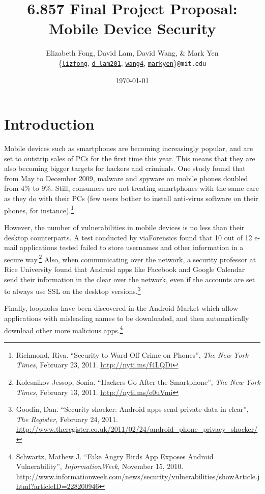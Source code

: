 \documentclass[11pt]{article}
\begin{document}
\title{6.857 Final Project Proposal: Mobile Device Security}
\author{Elizabeth Fong, David Lam, David Wang, \& Mark Yen\\
\{\href{mailto:lizfong@mit.edu}{\texttt{lizfong}}, \href{mailto:d_lam201@mit.edu}{\texttt{d\_lam201}}, \href{mailto:wang4@mit.edu}{\texttt{wang4}}, \href{mailto:markyen@mit.edu}{\texttt{markyen}}\}\texttt{@mit.edu}}
\date{\today}
\maketitle

\section{Introduction}
Mobile devices such as smartphones are becoming increasingly popular, and are set to outstrip sales of PCs for the first time this year. This means that they are also becoming bigger targets for hackers and criminals. One study found that from May to December 2009, malware and spyware on mobile phones doubled from 4\% to 9\%. Still, consumers are not treating smartphones with the same care as they do with their PCs (few users bother to install anti-virus software on their phones, for instance).\footnote{Richmond, Riva. ``Security to Ward Off Crime on Phones'', \textit{The New York Times}, February 23, 2011. \url{http://nyti.ms/f4LQDi}}

However, the number of vulnerabilities in mobile devices is no less than their desktop counterparts. A test conducted by viaForensics found that 10 out of 12 e-mail applications tested failed to store usernames and other information in a secure way.\footnote{Kolesnikov-Jessop, Sonia. ``Hackers Go After the Smartphone'', \textit{The New York Times}, February 13, 2011. \url{http://nyti.ms/e0uVmi}} Also, when communicating over the network, a security professor at Rice University found that Android apps like Facebook and Google Calendar send their information in the clear over the network, even if the accounts are set to always use SSL on the desktop versions.\footnote{Goodin, Dan. ``Security shocker: Android apps send private data in clear'', \textit{The Register}, February 24, 2011. \url{http://www.theregister.co.uk/2011/02/24/android_phone_privacy_shocker/}}

Finally, loopholes have been discovered in the Android Market which allow applications with misleading names to be downloaded, and then automatically download other more malicious apps.\footnote{Schwartz, Mathew J. ``Fake Angry Birds App Exposes Android Vulnerability'', \textit{InformationWeek}, November 15, 2010. \url{http://www.informationweek.com/news/security/vulnerabilities/showArticle.jhtml?articleID=228200946}}
\end{document}
